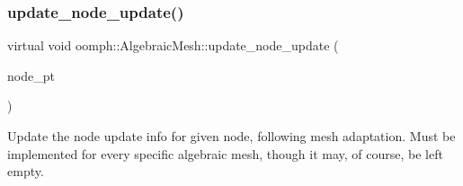 \mbox{\label{classoomph_1_1AlgebraicMesh_a6c6a35ae2be6e2766f5b80d85693c1ce}} 
\subsubsection{\texorpdfstring{update\+\_\+node\+\_\+update()}{update\_node\_update()}}
{\footnotesize\ttfamily virtual void oomph\+::\+Algebraic\+Mesh\+::update\+\_\+node\+\_\+update (\begin{DoxyParamCaption}\item[{\hyperlink{classoomph_1_1AlgebraicNode}{Algebraic\+Node} $\ast$\&}]{node\+\_\+pt }\end{DoxyParamCaption})\hspace{0.3cm}{\ttfamily [pure virtual]}}



Update the node update info for given node, following mesh adaptation. Must be implemented for every specific algebraic mesh, though it may, of course, be left empty. 



